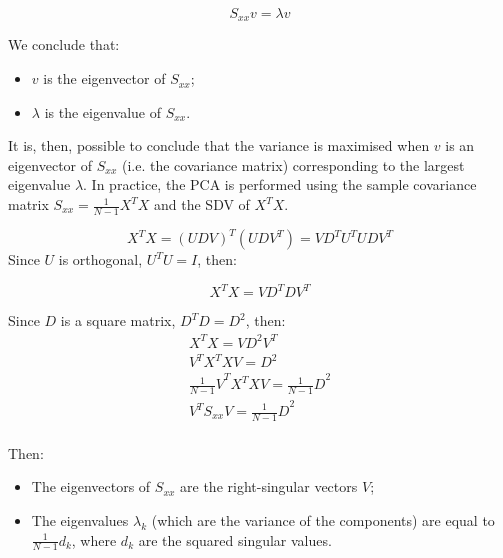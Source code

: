 \begin{equation}
S_{xx}v=\lambda v
\label{eq_PCA5}
\end{equation}

We conclude that:
\begin{itemize}
    \item $v$ is the eigenvector of $S_{xx}$;
    \item $\lambda$ is the eigenvalue of $S_{xx}$.
\end{itemize}

It is, then, possible to conclude that the variance is maximised when $v$ is an eigenvector of $S_{xx}$ (i.e. the covariance matrix) corresponding to the largest eigenvalue $\lambda$. In practice, the PCA is performed using the sample covariance matrix $S_{xx}=\frac{1}{N-1}X^TX$ and the SDV of $X^TX$.

\begin{equation}
X^TX=\left(UDV\right)^T\left(UDV^T\right)=VD^TU^TUDV^T
\label{eq_PCA6}
\end{equation}
Since $U$ is orthogonal, $U^TU=I$, then:

\begin{equation}
X^TX=VD^TDV^T
\label{eq_PCA7}
\end{equation}

Since $D$ is a square matrix, $D^TD=D^2$, then:
\begin{equation}
\begin{split}
    X^TX=VD^2V^T \\
    V^TX^TXV=D^2 \\
    {\frac{1}{N-1}V}^TX^TXV={\frac{1}{N-1}D}^2 \\
    V^TS_{xx}V={\frac{1}{N-1}D}^2 \\
\end{split}
\label{eq_PCA8}
\end{equation}

Then:
\begin{itemize}
    \item The eigenvectors of $S_{xx}$ are the right-singular vectors $V$;
    \item The eigenvalues $\lambda_k$ (which are the variance of the components) are equal to $\frac{1}{N-1}d_k$, where $d_k$ are the squared singular values.
\end{itemize}

